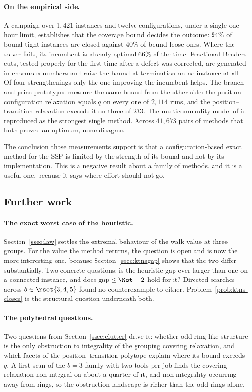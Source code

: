\paragraph{On the empirical side.}
A campaign over $1{,}421$ instances and twelve configurations, under a single one-hour
limit, establishes that the coverage bound decides the outcome: $94\%$ of bound-tight
instances are closed against $40\%$ of bound-loose ones. Where the solver fails, its
incumbent is already optimal $66\%$ of the time. Fractional Benders cuts, tested
properly for the first time after a defect was corrected, are generated in enormous
numbers and raise the bound at termination on no instance at all. Of four
strengthenings only the one improving the incumbent helps. The branch-and-price
prototypes measure the same bound from the other side: the position--configuration
relaxation equals $q$ on every one of $2{,}114$ runs, and the position--transition
relaxation exceeds it on three of $233$. The multicommodity model of
\citet{daSilva2024} is reproduced as the strongest single method. Across $41{,}673$
pairs of methods that both proved an optimum, none disagree.

The conclusion those measurements support is that a configuration-based exact method
for the SSP is limited by the strength of its bound and not by its implementation.
This is a negative result about a family of methods, and it is a useful one, because it
says where effort should not go.

\subsection{Further work}\label{ssec:further}

\paragraph{The exact worst case of the heuristic.}
Section~\ref{ssec:law} settles the extremal behaviour of the walk value at three
groups. For the value the method returns, the question is open and is now the more
interesting one, because Section~\ref{ssec:ktnsgap} shows that the two differ
substantially. Two concrete questions: is the heuristic gap ever larger than one on a
connected instance, and does $\mathrm{gap}\le\Kst-2$ hold for it? Directed searches
across $b\in\rset{3,4,5}$ found no counterexample to either.
Problem~\ref{prob:ktns-closes} is the structural question underneath both.

\paragraph{The polyhedral questions.}
Two questions from Section~\ref{ssec:clutter} drive it: whether odd-ring-like
structure is the only obstruction to integrality of the grouping covering relaxation,
and which facets of the position--transition polytope explain where its bound exceeds
$q$. A first scan of the $b=3$ family with two tools per job finds the covering
relaxation non-integral on about a quarter of it, and non-integrality occurring away
from rings, so the obstruction landscape is richer than the odd rings alone.

